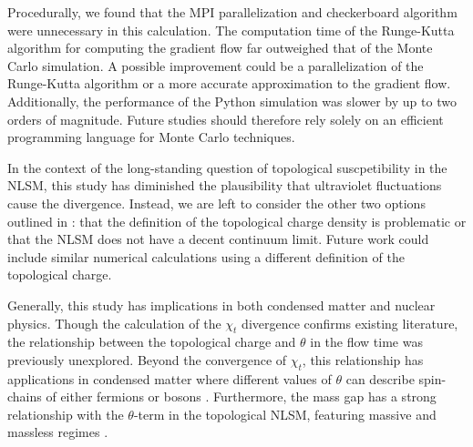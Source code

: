 Procedurally, we found that the MPI parallelization and checkerboard algorithm were unnecessary in this calculation. The computation time of the Runge-Kutta algorithm for computing the gradient flow far outweighed that of the Monte Carlo simulation. A possible improvement could be a parallelization of the Runge-Kutta algorithm or a more accurate approximation to the gradient flow. Additionally, the performance of the Python simulation was slower by up to two orders of magnitude. Future studies should therefore rely solely on an efficient programming language for Monte Carlo techniques.

In the context of the long-standing question of topological suscpetibility in the NLSM, this study has diminished the plausibility that ultraviolet fluctuations cause the divergence. Instead, we are left to consider the other two options outlined in \cite{berg1981}: that the definition of the topological charge density is problematic or that the NLSM does not have a decent continuum limit. Future work could include similar numerical calculations using a different definition of the topological charge.

Generally, this study has implications in both condensed matter and nuclear physics. Though the calculation of the $\chi_t$ divergence confirms existing literature, the relationship between the topological charge and $\theta$ in the flow time was previously unexplored. Beyond the convergence of $\chi_t$, this relationship has applications in condensed matter where different values of $\theta$ can describe spin-chains of either fermions or bosons \cite{bogli2012}. Furthermore, the mass gap has a strong relationship with the $\theta$-term in the topological NLSM, featuring massive and massless regimes \cite{allessalom2008}.


